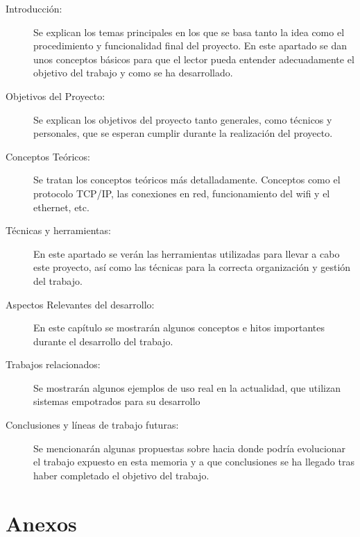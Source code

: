 \begin{description}
	\item[Introducción:] Se explican los temas principales en los que se basa tanto la idea como el procedimiento y funcionalidad final del proyecto. En este apartado se dan unos conceptos básicos para que el lector pueda entender adecuadamente el objetivo del trabajo y como se ha desarrollado.

	\item[Objetivos del Proyecto:] Se explican los objetivos del proyecto tanto generales, como técnicos y personales, que se esperan cumplir durante la realización del proyecto.

	\item[Conceptos Teóricos:] Se tratan los conceptos teóricos más detalladamente. Conceptos como el protocolo TCP/IP, las conexiones en red, funcionamiento del wifi y el ethernet, etc.

	\item[Técnicas y herramientas:] En este apartado se verán las herramientas utilizadas para llevar a cabo este proyecto, así como las técnicas para la correcta organización y gestión del trabajo.

	\item[Aspectos Relevantes del desarrollo:] En este capítulo se mostrarán algunos conceptos e hitos importantes durante el desarrollo del trabajo.

	\item[Trabajos relacionados:] Se mostrarán algunos ejemplos de uso real en la actualidad, que utilizan sistemas empotrados para su desarrollo

	\item[Conclusiones y líneas de trabajo futuras:] Se mencionarán algunas propuestas sobre hacia donde podría evolucionar el trabajo expuesto en esta memoria y a que conclusiones se ha llegado tras haber completado el objetivo del trabajo.
\end{description}

\section{Anexos}\label{sec:anexos}

